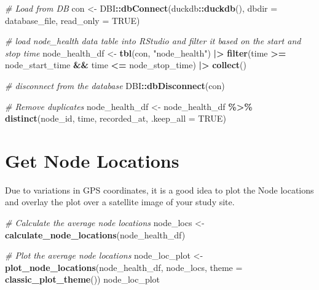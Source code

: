 \documentclass[
]{book}
\newenvironment{Shaded}{\begin{snugshade}}{\end{snugshade}}
\newcommand{\AttributeTok}[1]{\textcolor[rgb]{0.13,0.29,0.53}{#1}}
\newcommand{\CommentTok}[1]{\textcolor[rgb]{0.56,0.35,0.01}{\textit{#1}}}
\newcommand{\ConstantTok}[1]{\textcolor[rgb]{0.56,0.35,0.01}{#1}}
\newcommand{\FunctionTok}[1]{\textcolor[rgb]{0.13,0.29,0.53}{\textbf{#1}}}
\newcommand{\NormalTok}[1]{#1}
\newcommand{\OtherTok}[1]{\textcolor[rgb]{0.56,0.35,0.01}{#1}}
\newcommand{\SpecialCharTok}[1]{\textcolor[rgb]{0.81,0.36,0.00}{\textbf{#1}}}
\newcommand{\StringTok}[1]{\textcolor[rgb]{0.31,0.60,0.02}{#1}}
\begin{document}
\begin{Shaded}
\begin{Highlighting}[]
\CommentTok{\# Load from DB}
\NormalTok{con }\OtherTok{\textless{}{-}}\NormalTok{ DBI}\SpecialCharTok{::}\FunctionTok{dbConnect}\NormalTok{(duckdb}\SpecialCharTok{::}\FunctionTok{duckdb}\NormalTok{(), }
                      \AttributeTok{dbdir =}\NormalTok{ database\_file, }
                      \AttributeTok{read\_only =} \ConstantTok{TRUE}\NormalTok{)}

\CommentTok{\# load node\_health data table into RStudio and filter it based on the start and stop time}
\NormalTok{node\_health\_df }\OtherTok{\textless{}{-}} \FunctionTok{tbl}\NormalTok{(con, }\StringTok{"node\_health"}\NormalTok{) }\SpecialCharTok{|\textgreater{}}
  \FunctionTok{filter}\NormalTok{(time }\SpecialCharTok{\textgreater{}=}\NormalTok{ node\_start\_time }\SpecialCharTok{\&\&}\NormalTok{ time }\SpecialCharTok{\textless{}=}\NormalTok{ node\_stop\_time) }\SpecialCharTok{|\textgreater{}}
  \FunctionTok{collect}\NormalTok{()}

\CommentTok{\# disconnect from the database}
\NormalTok{DBI}\SpecialCharTok{::}\FunctionTok{dbDisconnect}\NormalTok{(con)}

\CommentTok{\# Remove duplicates}
\NormalTok{node\_health\_df }\OtherTok{\textless{}{-}}\NormalTok{ node\_health\_df }\SpecialCharTok{\%\textgreater{}\%} 
  \FunctionTok{distinct}\NormalTok{(node\_id, }
\NormalTok{           time, }
\NormalTok{           recorded\_at, }
           \AttributeTok{.keep\_all =} \ConstantTok{TRUE}\NormalTok{)}
\end{Highlighting}
\end{Shaded}

\section{Get Node Locations}\label{get-node-locations-1}

Due to variations in GPS coordinates, it is a good idea to plot the Node locations and overlay the plot over a satellite image of your study site.

\begin{Shaded}
\begin{Highlighting}[]
\CommentTok{\# Calculate the average node locations}
\NormalTok{node\_locs }\OtherTok{\textless{}{-}} \FunctionTok{calculate\_node\_locations}\NormalTok{(node\_health\_df)}

\CommentTok{\# Plot the average node locations}
\NormalTok{node\_loc\_plot }\OtherTok{\textless{}{-}} \FunctionTok{plot\_node\_locations}\NormalTok{(node\_health\_df, }
\NormalTok{                                     node\_locs, }
                                     \AttributeTok{theme =} \FunctionTok{classic\_plot\_theme}\NormalTok{())}
\NormalTok{node\_loc\_plot}
\end{Highlighting}
\end{Shaded}
\end{document}
